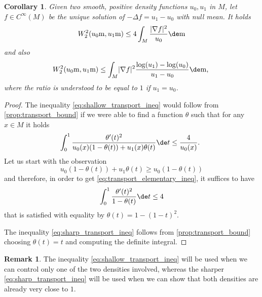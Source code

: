 \documentclass[JEP,XML,SOM,Unicode]{cedram}
\newcounter{results}[section]
\theoremstyle{plain}
\newtheorem{corollary}[results]{Corollary}
\theoremstyle{definition}
\newtheorem{remark}[results]{Remark}
\numberwithin{equation}{section}
\newcommand{\lapl}{\ensuremath{\Delta}}
\renewcommand{\comma}{\ensuremath{\text{, }}}
\newcommand{\comma}{\ensuremath{\text{, }}}
\newcommand{\fullstop}{\ensuremath{\text{. }}}
\newcommand{\m}{\ensuremath{\mathrm m}}
\DeclarePairedDelimiter\abs{\lvert}{\rvert}
\begin{document}
\begin{corollary}
Given two smooth, positive density functions $u_0, u_1$ in $M$, let $f\in C^\infty(M)$
be the unique solution of $-\lapl f = u_1-u_0$ with null mean.
It holds
\begin{equation}\label{eq:shallow_transport_ineq}
W_2^2(u_0\m, u_1\m)\le 4 \int_M \frac{\abs{\nabla f}^2}{u_0}\de\m
\end{equation}
and also
\begin{equation}\label{eq:sharp_transport_ineq}
W_2^2(u_0\m, u_1\m)\le \int_M \abs{\nabla f}^2\frac{\log(u_1)-\log(u_0)}{u_1-u_0}\de\m \comma
\end{equation}
where the ratio is understood to be equal to $1$ if $u_1=u_0$.
\end{corollary}
\begin{proof}
The inequality \cref{eq:shallow_transport_ineq} would follow from \cref{prop:transport_bound}
if we were able to find a function $\theta$ such that for any $x\in M$ it holds
\begin{equation}\label{eq:transport_elementary_ineq}
\int_0^1\frac{\theta'(t)^2}{u_0(x)(1-\theta(t))+u_1(x)\theta(t)}\de t \le \frac{4}{u_0(x)}\fullstop
\end{equation}
Let us start with the observation
\begin{equation*}
u_0(1-\theta(t))+u_1\theta(t) \ge u_0(1-\theta(t))
\end{equation*}
and therefore, in order to get \cref{eq:transport_elementary_ineq}, it suffices to have
\begin{equation*}
\int_0^1\frac{\theta'(t)^2}{1-\theta(t)}\de t \le 4
\end{equation*}
that is satisfied with equality by $\theta(t) = 1-(1-t)^2$.

The inequality \cref{eq:sharp_transport_ineq} follows from \cref{prop:transport_bound}
choosing $\theta(t)=t$ and computing the definite integral.
\end{proof}
\begin{remark}
The inequality \cref{eq:shallow_transport_ineq} will be used when we can control only one
of the two densities involved, whereas the sharper \cref{eq:sharp_transport_ineq} will be used
when we can show that both densities are already very close to $1$.
\end{remark}
\end{document}
